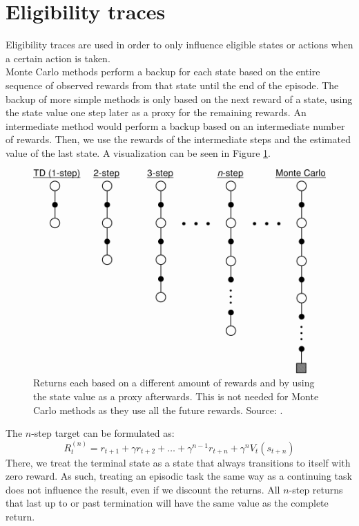 \section{Eligibility traces}
\label{sub:rl_et}
Eligibility traces are used in order to only influence eligible states or actions when a certain action is taken.\\
Monte Carlo methods perform a backup for each state based on the entire sequence of observed rewards from that state until the end of the episode.
The backup of more simple methods is only based on the next reward of a state, using the state value one step later as a proxy for the remaining rewards.
An intermediate method would perform a backup based on an intermediate number of rewards.
Then, we use the rewards of the intermediate steps and the estimated value of the last state.
A visualization can be seen in Figure \ref{fig:nStepTD}.
\begin{figure}[htb]
\includegraphics[width=.8\linewidth]{images/nStepTD.png}
\caption[$n$-step returns]{Returns each based on a different amount of rewards and by using the state value as a proxy afterwards. This is not needed for Monte Carlo methods as they use all the future rewards. Source: \cite{Sutton1998ReinforcementIntroduction}.}
\label{fig:nStepTD}
\end{figure}
The $n$-step target can be formulated as:
\begin{equation}
R_t^{(n)} = r_{t+1} + \gamma r_{t+2} + \dots + \gamma^{n-1}r_{t+n} + \gamma^n V_t(s_{t+n})
\end{equation}
There, we treat the terminal state as a state that always transitions to itself with zero reward. As such, treating an episodic task the same way as a continuing task does not influence the result, even if we discount the returns. All $n$-step returns that last up to or past termination will have the same value as the complete return.\\
